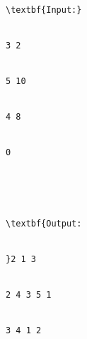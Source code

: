 \begin{verbatim}
\textbf{Input:}


3 2


5 10


4 8


0





\textbf{Output:


}2 1 3


2 4 3 5 1


3 4 1 2


\end{verbatim}